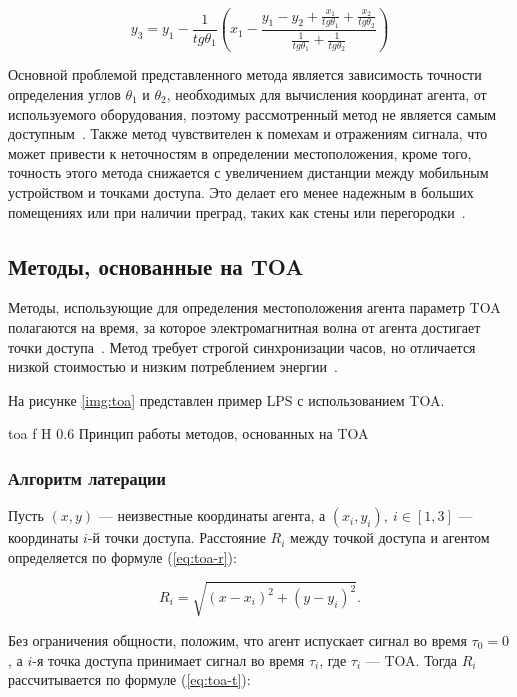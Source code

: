 \begin{equation}
    y_3 = y_1 - \frac{1}{tg\theta_1}\left(x_1 - \frac{y_1 - y_2 + \frac{x_1}{tg\theta_1} + \frac{x_2}{tg\theta_2}}{\frac{1}{tg\theta_1} + \frac{1}{tg\theta_2}}\right)
    \label{eq:aoa-y}
\end{equation}

Основной проблемой представленного метода является зависимость точности определения углов $\theta_1$ и $\theta_2$, необходимых для вычисления координат агента, от используемого оборудования, поэтому рассмотренный метод не является самым доступным~\cite{aoa-modern}. Также метод чувствителен к помехам и отражениям сигнала, что может привести к неточностям в определении местоположения, кроме того, точность этого метода снижается с увеличением дистанции между мобильным устройством и точками доступа. Это делает его менее надежным в больших помещениях или при наличии преград, таких как стены или перегородки~\cite{aoa}.

\clearpage

\subsection{Методы, основанные на TOA}

Методы, использующие для определения местоположения агента параметр TOA полагаются на время, за которое электромагнитная волна от агента достигает точки доступа~\cite{trends}. Метод требует строгой синхронизации часов, но отличается низкой стоимостью и низким потреблением энергии~\cite{toa}.

На рисунке \ref{img:toa} представлен пример LPS с использованием TOA.

    {toa}
    {f}
    {H}
    {0.6\linewidth}
    {Принцип работы методов, основанных на TOA}

\subsubsection{Алгоритм латерации}

Пусть $(x, y)$ --- неизвестные координаты агента, а $(x_i, y_i),~i \in [1, 3]$ --- координаты $i$-й точки доступа. Расстояние $R_i$ между точкой доступа и агентом определяется по формуле (\ref{eq:toa-r}):

\begin{equation}
    R_i = \sqrt{(x - x_i)^2 + (y - y_i)^2}.
    \label{eq:toa-r}
\end{equation}

Без ограничения общности, положим, что агент испускает сигнал во время $\tau_0 = 0$, а $i$-я точка доступа принимает сигнал во время $\tau_i$, где $\tau_i$ --- TOA. Тогда $R_i$ рассчитывается по формуле (\ref{eq:toa-t}):

